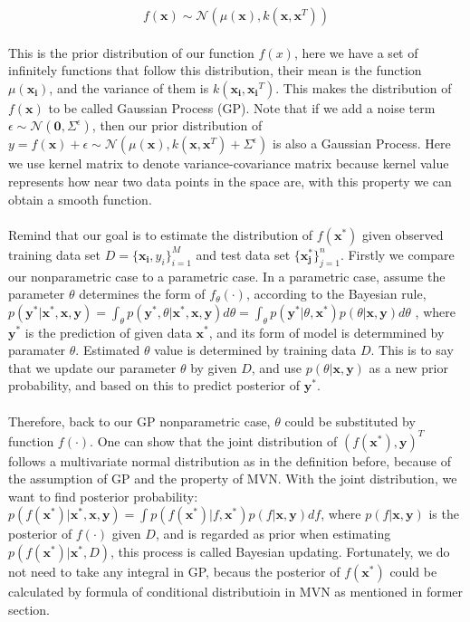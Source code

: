 \begin{equation}
f(\boldsymbol{x}) \sim \mathcal{N}(\mu(\boldsymbol{x}), k(\boldsymbol{x},\boldsymbol{x}^T)) 
\end{equation}
\\ 
This is the prior distribution of our function $f(x)$, here we have a set of infinitely functions that follow this distribution, their mean is the function $\mu(\boldsymbol{x_i})$, and the variance of them is $k(\boldsymbol{x_i},\boldsymbol{x_i}^T)$. This makes the distribution of $f(\boldsymbol{x})$ to be called Gaussian Process (GP). Note that if we add a noise term $\epsilon \sim \mathcal{N}(\boldsymbol{0},\varSigma^{\epsilon})$, then our prior distribution of $y = f(\boldsymbol{x}) + \epsilon \sim \mathcal{N}(\mu(\boldsymbol{x}), k(\boldsymbol{x},\boldsymbol{x}^T) + \varSigma^{\epsilon})$ is also a Gaussian Process. Here we use kernel matrix to denote variance-covariance matrix because kernel value represents how near two data points in the space are, with this property we can obtain a smooth function.  \\ \\
Remind that our goal is to estimate the distribution of $f(\boldsymbol{x^*})$ given observed training data set $D = \{\boldsymbol{x_i}, y_i\}_{i = 1}^M$ and test data set $\{\boldsymbol{x_j^*}\}_{j = 1}^n$. Firstly we compare our nonparametric case to a parametric case. In a parametric case, assume the parameter $\theta$ determines the form of $f_{\theta}(\cdot)$, according to the Bayesian rule, 
$
p(\boldsymbol{y^*} | \boldsymbol{x^*}, \boldsymbol{x}, \boldsymbol{y}) = \int_{\theta} p(\boldsymbol{y^*}, \theta |  \boldsymbol{x^*}, \boldsymbol{x}, \boldsymbol{y})d\theta = \int_{\theta} p(\boldsymbol{y^*} | \theta, \boldsymbol{x^*})p(\theta | \boldsymbol{x}, \boldsymbol{y})d\theta
$
, where $\boldsymbol{y^*}$ is the prediction of given data $\boldsymbol{x^*}$, and its form of model is determmined by paramater $\theta$. Estimated $\theta$ value is determined by training data $D$. This is to say that we update our parameter $\theta$ by given $D$, and use $p(\theta |  \boldsymbol{x}, \boldsymbol{y})$ as a new prior probability, and based on this to predict posterior of $\boldsymbol{y^*}$.  \\ \\
Therefore, back to our GP nonparametric case, $\theta$ could be substituted by function $f(\cdot)$. One can show that the joint distribution of $(f(\boldsymbol{x^*}), \boldsymbol{y})^T$ follows a multivariate normal distribution as in the definition before, because of the assumption of GP and the property of MVN. With the joint distribution, we want to find posterior probability:  $p(f(\boldsymbol{x^*}) | \boldsymbol{x^*}, \boldsymbol{x}, \boldsymbol{y}) = \int p(f(\boldsymbol{x^*})  | f, \boldsymbol{x^*})p(f | \boldsymbol{x}, \boldsymbol{y})df$, where $p(f | \boldsymbol{x}, \boldsymbol{y})$ is the posterior of $f(\cdot)$ given $D$, and is regarded as prior when estimating $p(f(\boldsymbol{x^*}) | \boldsymbol{x^*}, D)$, this process is called Bayesian updating. Fortunately, we do not need to take any integral in GP, becaus the posterior of $f(\boldsymbol{x^*})$ could be calculated by formula of conditional distributioin in MVN as mentioned in former section. 

